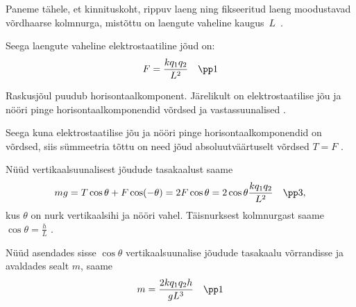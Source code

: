 Paneme tähele, et kinnituskoht, rippuv laeng ning fikseeritud laeng moodustavad võrdhaarse kolmnurga, mistõttu on laengute vaheline kaugus~$L$~.

Seega laengute vaheline elektrostaatiline jõud on:
$$F=\frac{kq_1q_2}{L^2} \quad \pp1$$

Raskusjõul puudub horisontaalkomponent. Järelikult on elektrostaatilise jõu ja nööri pinge horisontaalkomponendid võrdsed ja vastassuunalised .

Seega kuna elektrostaatilise jõu ja nööri pinge horisontaalkomponendid on võrdsed, siis sümmeetria tõttu on need jõud absoluutväärtuselt võrdsed $T=F$ .

Nüüd vertikaalsuunalisest jõudude tasakaalust saame
$$mg=T\cos\theta + F\cos (-\theta) = 2F\cos\theta = 2 \cos\theta \frac{kq_1q_2}{L^2} \quad \pp3,$$
kus $\theta$ on nurk vertikaalsihi ja nööri vahel.
Täisnurksest kolmnurgast saame $\cos\theta = \frac hL$ .

Nüüd asendades sisse $\cos\theta$ vertikaalsuunalise jõudude tasakaalu võrrandisse ja avaldades sealt $m$, saame
$$m=\frac{2kq_1q_2h}{gL^3} \quad \pp1$$
\probend